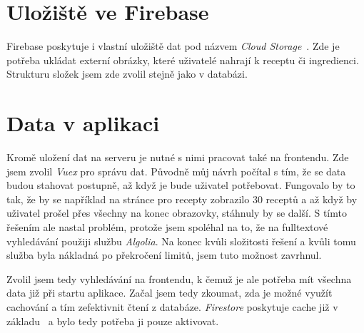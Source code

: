 \section{Uložiště ve Firebase}
Firebase poskytuje i vlastní uložiště dat pod názvem \emph{Cloud Storage}~\cite{CloudStorage}. Zde je potřeba ukládat externí obrázky, které uživatelé
nahrají k receptu či ingredienci. Strukturu složek jsem zde zvolil stejně jako v databázi.

\section{Data v aplikaci}
Kromě uložení dat na serveru je nutné s nimi pracovat také na frontendu. Zde jsem zvolil \emph{Vuex} pro správu dat. Původně
můj návrh počítal s tím, že se data budou stahovat postupně, až když je bude uživatel potřebovat. Fungovalo by to tak, že by
se například na stránce pro recepty zobrazilo 30 receptů a až když by uživatel prošel přes všechny na konec obrazovky, stáhnuly
by se další. S tímto řešením ale nastal problém, protože jsem spoléhal na to, že na fulltextové vyhledávání použiji službu
\emph{Algolia}. Na konec kvůli složitosti řešení a kvůli tomu služba byla nákladná po překročení limitů, jsem tuto možnost zavrhnul.

Zvolil jsem tedy vyhledávání na frontendu, k čemuž je ale potřeba mít všechna data již při startu aplikace. Začal jsem tedy
zkoumat, zda je možné využít cachování a tím zefektivnit čtení z databáze. \emph{Firestore} poskytuje cache již v základu~\cite{FirestoreCache} a bylo
tedy potřeba ji pouze aktivovat.
